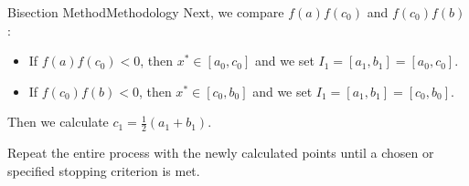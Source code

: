 \documentclass[12pt,aspectratio=169,envcountset]{beamer}
\begin{document}
\begin{frame}{Bisection Method}{Methodology}
  Next, we compare $f(a)f(c_0)$ and $f(c_0)f(b)$:
    
  \begin{itemize}
    \item If $f(a)f(c_0) < 0$, then $x^* \in [a_0,c_0]$ and we set $I_1 =
      [a_1,b_1] = [a_0,c_0]$.  
    \item If $f(c_0)f(b) < 0$, then $x^* \in [c_0,b_0]$ and we set $I_1 =
      [a_1,b_1] = [c_0,b_0]$.
  \end{itemize}
  Then we calculate $c_1 = \frac{1}{2}(a_1 + b_1)$. 
  \begin{center}
  \end{center}

  Repeat the entire process with the newly calculated points until a chosen or 
  specified stopping criterion is met.
\end{frame}
\end{document}
